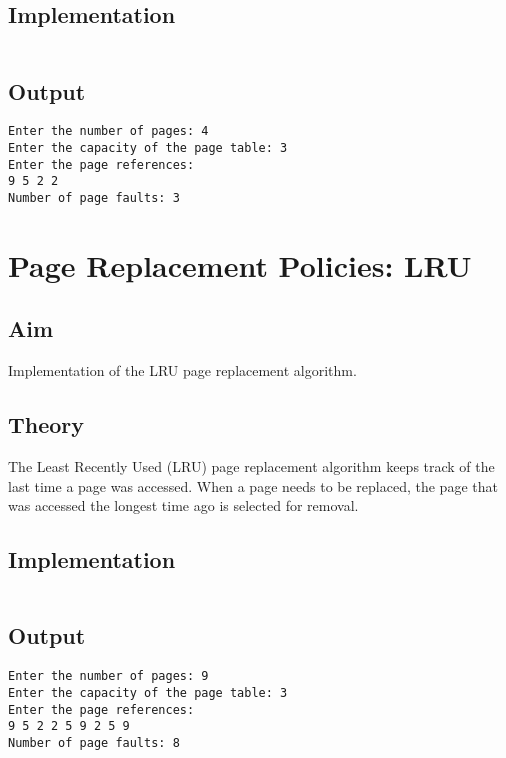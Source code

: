 \subsection{Implementation}

\inputminted[fontsize=\footnotesize]{c}{code/page_fifo.c}

\subsection{Output}
\begin{lstlisting}[style=output]
Enter the number of pages: 4
Enter the capacity of the page table: 3
Enter the page references:
9 5 2 2
Number of page faults: 3
\end{lstlisting}

\section{Page Replacement Policies: LRU}
\label{sec:page-replacement-lru}

\subsection{Aim}
Implementation of the LRU page replacement algorithm.

\subsection{Theory}
The Least Recently Used (LRU) page replacement algorithm
keeps track of the last time a page was accessed.
When a page needs to be replaced, the page that was accessed the longest time ago is selected for removal.

\subsection{Implementation}

\inputminted[fontsize=\footnotesize]{c}{code/page_lru.c}

\pagebreak
\subsection{Output}
\begin{lstlisting}[style=output]
Enter the number of pages: 9
Enter the capacity of the page table: 3
Enter the page references:
9 5 2 2 5 9 2 5 9
Number of page faults: 8
\end{lstlisting}
